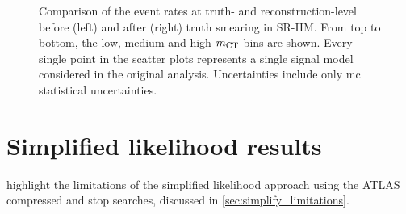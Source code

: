 \begin{figure}
\begin{subfigure}[b]{0.49\linewidth}
	\end{subfigure}
	\caption{Comparison of the event rates at truth- and reconstruction-level before (left) and after (right) truth smearing in SR-HM. From top to bottom, the low, medium and high $m_{\textrm{CT}}$ bins are shown. Every single point in the scatter plots represents a single signal model considered in the original \onelepton analysis. Uncertainties include only \gls{mc} statistical uncertainties.}
	\label{fig:smearing_signal_regions_3}
\end{figure}


\FloatBarrier

\ifpdf
\graphicspath{{chapter-simplify/Figs/Raster/}{chapter-simplify/Figs/PDF/}{chapter-simplify/Figs/}}
\else
\graphicspath{{chapter-simplify/Figs/Vector/}{chapter-simplify/Figs/}}
\fi

\section{Simplified likelihood results}


 highlight the limitations of the simplified likelihood approach using the ATLAS compressed and stop searches, discussed in \cref{sec:simplify_limitations}.

